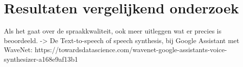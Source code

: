 
\chapter{Resultaten vergelijkend onderzoek}
\label{ch:Resultaten vergelijkend onderzoek}

Als het gaat over de spraakkwaliteit, ook meer uitleggen wat er precies is beoordeeld.
-> De Text-to-speech of speech synthesis, bij Google Assistant met WaveNet: https://towardsdatascience.com/wavenet-google-assistants-voice-synthesizer-a168e9af13b1
